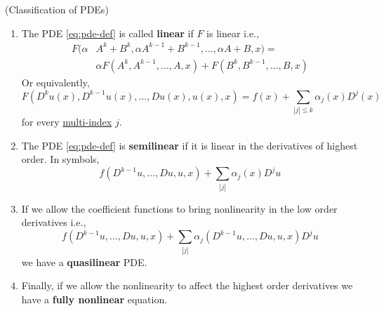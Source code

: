\documentclass{bkcnotes}
\begin{document}
\begin{ndefn}(Classification of PDEs)
  \ \newline \vspace{-20px}
  \begin{enumerate}
  \item The PDE \eqref{eq:pde-def} is called \textbf{linear} if $F$ is
    linear i.e.,
    \begin{equation}
      \begin{aligned}
        F(\alpha &A^k + B^k, \alpha A^{k-1} + B^{k-1}, \ldots, \alpha A + B,x)
        = \\
        &\alpha F(A^k,A^{k-1},\ldots,A,x) + F(B^k,B^{k-1},\ldots,B,x)
      \end{aligned}
    \end{equation}
    Or equivalently,
    \begin{equation}
      \label{eq:linear}
      F(D^ku(x),D^{k-1}u(x),\ldots,Du(x),u(x),x) =
      f(x) + \sum_{|j| \leq k} \alpha_j(x)D^j(x)
    \end{equation}
    for every
    \href{http://en.wikipedia.org/wiki/Multi-index_notation}{multi-index}
    $j$.
  \item The PDE \eqref{eq:pde-def} is \textbf{semilinear} if it is
    linear in the derivatives of highest order. In symbols,
    \begin{equation}
      \label{eq:semilinear}
      f(D^{k-1}u,\ldots,Du,u,x) + \sum_{|j|}\alpha_j(x)D^ju
    \end{equation}
  \item If we allow the coefficient functions to bring nonlinearity in
    the low order derivatives i.e.,
    \begin{equation}
      \label{eq:quasilinear}
      f(D^{k-1}u,\ldots,Du,u,x) + \sum_{|j|}\alpha_j(D^{k-1}u,\ldots,Du,u,x)D^ju
    \end{equation}
    we have a \textbf{quasilinear} PDE.
  \item Finally, if we allow the nonlinearity to affect the highest
    order derivatives we have a \textbf{fully nonlinear} equation.
  \end{enumerate}
\end{ndefn}
\end{document}
